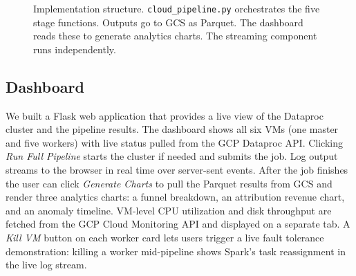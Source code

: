 \documentclass[letterpaper,twocolumn,10pt]{article}
\begin{document}
\begin{figure}[H]
\caption{Implementation structure. \texttt{cloud\_pipeline.py} orchestrates the five
stage functions. Outputs go to GCS as Parquet. The dashboard reads these to generate
analytics charts. The streaming component runs independently.}
\label{fig:impl}
\end{figure}

\subsection{Dashboard}

We built a Flask web application that provides a live view of the Dataproc cluster
and the pipeline results. The dashboard shows all six VMs (one master and five
workers) with live status pulled from the GCP Dataproc API. Clicking
\textit{Run Full Pipeline} starts the cluster if needed and submits the job. Log
output streams to the browser in real time over server-sent events. After the job
finishes the user can click \textit{Generate Charts} to pull the Parquet results
from GCS and render three analytics charts: a funnel breakdown, an attribution
revenue chart, and an anomaly timeline. VM-level CPU utilization and disk throughput
are fetched from the GCP Cloud Monitoring API and displayed on a separate tab.
A \textit{Kill VM} button on each worker card lets users trigger a live fault
tolerance demonstration: killing a worker mid-pipeline shows Spark's task
reassignment in the live log stream.
\end{document}
